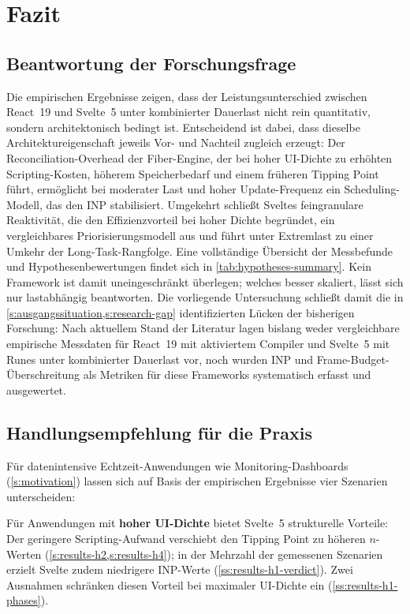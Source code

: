 \chapter{Fazit}
\label{ch:fazit}

\section{Beantwortung der Forschungsfrage}
\label{s:fazit-forschungsfrage}

Die empirischen Ergebnisse zeigen, dass der Leistungsunterschied zwischen React~19 und Svelte~5 unter kombinierter Dauerlast nicht rein quantitativ, sondern architektonisch bedingt ist. Entscheidend ist dabei, dass dieselbe Architektureigenschaft jeweils Vor- und Nachteil zugleich erzeugt: Der Reconciliation-Overhead der Fiber-Engine, der bei hoher UI-Dichte zu erhöhten Scripting-Kosten, höherem Speicherbedarf und einem früheren Tipping Point führt, ermöglicht bei moderater Last und hoher Update-Frequenz ein Scheduling-Modell, das den INP stabilisiert. Umgekehrt schließt Sveltes feingranulare Reaktivität, die den Effizienzvorteil bei hoher Dichte begründet, ein vergleichbares Priorisierungsmodell aus und führt unter Extremlast zu einer Umkehr der Long-Task-Rangfolge. Eine vollständige Übersicht der Messbefunde und Hypothesenbewertungen findet sich in \cref{tab:hypotheses-summary}. Kein Framework ist damit uneingeschränkt überlegen; welches besser skaliert, lässt sich nur lastabhängig beantworten. Die vorliegende Untersuchung schließt damit die in \cref{s:ausgangssituation,s:research-gap} identifizierten Lücken der bisherigen Forschung: Nach aktuellem Stand der Literatur lagen bislang weder vergleichbare empirische Messdaten für React~19 mit aktiviertem Compiler und Svelte~5 mit Runes unter kombinierter Dauerlast vor, noch wurden INP und Frame-Budget-Überschreitung als Metriken für diese Frameworks systematisch erfasst und ausgewertet.

\section{Handlungsempfehlung für die Praxis}
\label{s:fazit-empfehlung}

Für datenintensive Echtzeit-Anwendungen wie Monitoring-Dashboards (\cref{s:motivation}) lassen sich auf Basis der empirischen Ergebnisse vier Szenarien unterscheiden:

\noindent Für Anwendungen mit \textbf{hoher UI-Dichte} bietet Svelte~5 strukturelle Vorteile: Der geringere Scripting-Aufwand verschiebt den Tipping Point zu höheren $n$-Werten (\cref{s:results-h2,s:results-h4}); in der Mehrzahl der gemessenen Szenarien erzielt Svelte zudem niedrigere INP-Werte (\cref{ss:results-h1-verdict}). Zwei Ausnahmen schränken diesen Vorteil bei maximaler UI-Dichte ein (\cref{ss:results-h1-phases}).

